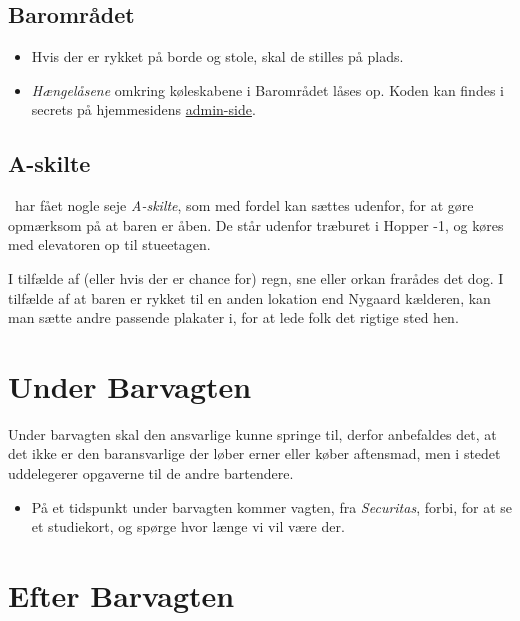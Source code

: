 \subsection{Barområdet}
\label{sec:pre:baromradet}

\begin{itemize}
    \item Hvis der er rykket på borde og stole, skal de stilles på plads.
    \item \textit{Hængelåsene} omkring køleskabene i Barområdet låses op. 
    Koden kan findes i secrets på hjemmesidens \href{https://fredagscafeen.dk/admin/admin/secrets/}{admin-side}.
\end{itemize}

\subsection{A-skilte}
\label{sec:pre:a-skilte}
\fredagscafeen\ har fået nogle seje \textit{A-skilte}, 
som med fordel kan sættes udenfor, 
for at gøre opmærksom på at baren er åben.
De står udenfor træburet i Hopper -1, og 
køres med elevatoren op til stueetagen.

I tilfælde af (eller hvis der er chance for) regn, sne eller orkan
frarådes det dog.
I tilfælde af at baren er rykket til en anden lokation end Nygaard kælderen, 
kan man sætte andre passende plakater i, for at lede folk det rigtige sted hen.

\section{Under Barvagten}
\label{sec:intra-barvagten}
Under barvagten skal den ansvarlige kunne springe til, 
derfor anbefaldes det, at det ikke er den baransvarlige 
der løber erner eller køber aftensmad, men i stedet uddelegerer
opgaverne til de andre bartendere.
\begin{itemize}
    \item På et tidspunkt under barvagten kommer vagten, fra \textit{Securitas}, forbi, 
    for at se et studiekort, og spørge hvor længe vi vil være der.
\end{itemize}

\section{Efter Barvagten}
\label{sec:post-barvagten}


